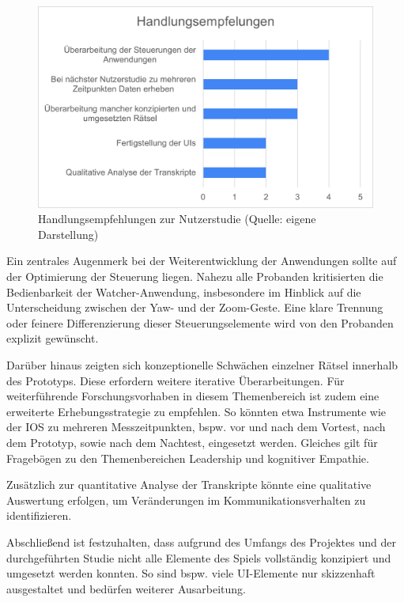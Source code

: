 \begin{figure}[ht]
\centering
\includegraphics[width=1\linewidth]{content/pictures/Handlungsempfehlung_Nutzerstudie.png}
\caption{Handlungsempfehlungen zur Nutzerstudie (Quelle: eigene Darstellung)}
\label{fig:call_to_actions_user_study}
\end{figure}

Ein zentrales Augenmerk bei der Weiterentwicklung der Anwendungen sollte auf der Optimierung der Steuerung liegen. Nahezu alle Probanden kritisierten die Bedienbarkeit der Watcher-Anwendung, insbesondere im Hinblick auf die Unterscheidung zwischen der Yaw- und der Zoom-Geste. Eine klare Trennung oder feinere Differenzierung dieser Steuerungselemente wird von den Probanden explizit gewünscht.

Darüber hinaus zeigten sich konzeptionelle Schwächen einzelner Rätsel innerhalb des Prototyps. Diese erfordern weitere iterative Überarbeitungen. Für weiterführende Forschungsvorhaben in diesem Themenbereich ist zudem eine erweiterte Erhebungsstrategie zu empfehlen. So könnten etwa Instrumente wie der \ac{IOS} zu mehreren Messzeitpunkten, bspw. vor und nach dem Vortest, nach dem Prototyp, sowie nach dem Nachtest, eingesetzt werden. Gleiches gilt für Fragebögen zu den Themenbereichen Leadership und kognitiver Empathie.

Zusätzlich zur quantitative Analyse der Transkripte könnte eine qualitative Auswertung erfolgen, um Veränderungen im Kommunikationsverhalten zu identifizieren.

Abschließend ist festzuhalten, dass aufgrund des Umfangs des Projektes und der durchgeführten Studie nicht alle Elemente des Spiels vollständig konzipiert und umgesetzt werden konnten. So sind bspw. viele \ac{UI}-Elemente nur skizzenhaft ausgestaltet und bedürfen weiterer Ausarbeitung.

